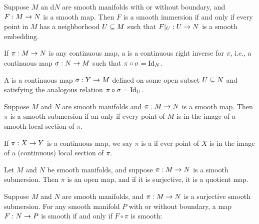 \setcounter{thm}{24}

\begin{thm}
Suppose $M$ an d$N$ are smooth manifolds with or without boundary, and $F:M\rightarrow N$ is a smooth map. Then $F$ is a smooth immersion if and only if every point in $M$ has a neighborhood $U\subseteq M$ such that $F|_U:U\rightarrow N$ is a smooth embedding.
\end{thm}

\dfn If $\pi:M\rightarrow N$ is any continuous map, a  is a continuous right inverse for $\pi$, i.e., a continuous map $\sigma:N\rightarrow M$ such that $\pi\circ \sigma = \text{Id}_N$.
\begin{center}
\end{center}
A  is a continuous map $\sigma:Y\rightarrow M$ defined on some open subset $U\subseteq N$ and satisfying the analogous relation $\pi\circ\sigma = \text{Id}_U$.

\begin{thm}
Suppose $M$ and $N$ are smooth manifolds and $\pi:M\rightarrow N$ is a smooth map. Then $\pi$ is a smooth submersion if an only if every point of $M$ is in the image of a smooth local section of $\pi$.
\end{thm}

\dfn If $\pi:X\rightarrow Y$ is a continuous map, we say $\pi$ is a  if ever point of $X$ is in the image of a (continuous) local section of $\pi$.

\setcounter{thm}{27}

\begin{thm}
Let $M$ and $N$ be smooth manifolds, and suppose $\pi:M\rightarrow N$ is a smooth submersion. Then $\pi$ is an open map, and if it is surjective, it is a quotient map.
\end{thm}

\begin{thm}
Suppose $M$ and $N$ are smooth manifolds, and $\pi:M\rightarrow N$ is a surjective smooth submersion. For any smooth manifold $P$ with or without boundary, a map $F:N\rightarrow P$ is smooth if and only if $F\circ \pi$ is smooth:
\begin{center}
\end{center}
\end{thm}

